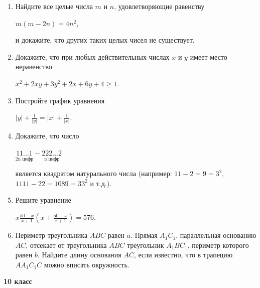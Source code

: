 \documentclass[a4paper,9pt]{article}
\begin{document}
\begin{multicols}{3}
\begin{enumerate}
    \item Найдите все целые числа \(m\) и \(n\), удовлетворяющие равенству
    \begin{center}
        \(m(m-2n)=4n^2\),
    \end{center}
    и докажите, что других таких целых чисел не существует.
    \item Докажите, что при любых действительных числах \(x\) и \(y\) имеет место неравенство
    \begin{center}
        \(x^2+2xy+3y^2+2x+6y+4\geq1\).
    \end{center}
    \item Постройте график уравнения
    \begin{center}
        \(|y|+\frac{1}{|y|}=|x|+\frac{1}{|x|}\).
    \end{center}
    \item Докажите, что число
    \begin{center}
        \(\underset{\text{2n цифр}}{\text{11...1}}-\underset{\text{n цифр}}{\text{222...2}}\)
    \end{center}
    является квадратом натурального числа (например: \(11-2=9=3^2\), \(1111-22=1089=33^2\) и т.д.).
    \item Решите уравнение
    \begin{center}
        \(x\frac{50-x}{x+1}(x+\frac{50-x}{x+1})=576\).
    \end{center}
    \item Периметр треугольника \(ABC\) равен \(a\). Прямая \(A_1C_1\), параллельная основанию \(AC\), отсекает от треугольника \(ABC\) треугольник \(A_1BC_1\), периметр которого равен \(b\). Найдите длину основания \(AC\), если известно, что в трапецию \(AA_1C_1C\) можно вписать окружность.
\end{enumerate}

\textbf{10 класс}


\end{multicols}
\end{document}
